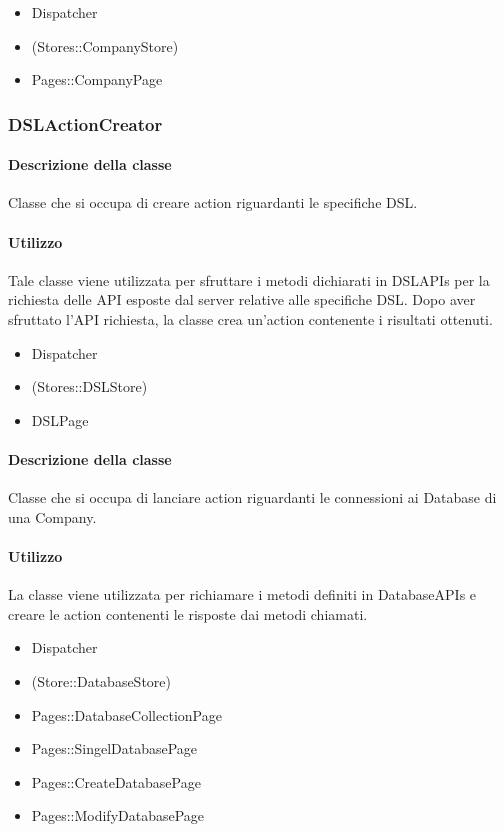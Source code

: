 \begin{itemize}
\item Dispatcher
\item (Stores::CompanyStore)
\item Pages::CompanyPage
\end{itemize}

\subsubsection{DSLActionCreator}
\paragraph*{Descrizione della classe}
Classe che si occupa di creare action riguardanti le specifiche DSL.
\paragraph*{Utilizzo}
Tale classe viene utilizzata per sfruttare i metodi dichiarati in DSLAPIs per la richiesta delle API esposte dal server relative alle specifiche DSL. Dopo aver sfruttato l'API richiesta, la classe crea un'action contenente i risultati ottenuti.

\begin{itemize}
\item Dispatcher
\item (Stores::DSLStore)
\item DSLPage
\end{itemize}

\paragraph*{Descrizione della classe}
Classe che si occupa di lanciare action riguardanti le connessioni ai Database di una Company.
\paragraph*{Utilizzo}
La classe viene utilizzata per richiamare i metodi definiti in DatabaseAPIs e creare le action contenenti le risposte dai metodi chiamati.
\begin{itemize}
\item Dispatcher
\item (Store::DatabaseStore)
\item Pages::DatabaseCollectionPage
\item Pages::SingelDatabasePage
\item Pages::CreateDatabasePage
\item Pages::ModifyDatabasePage
\end{itemize}

